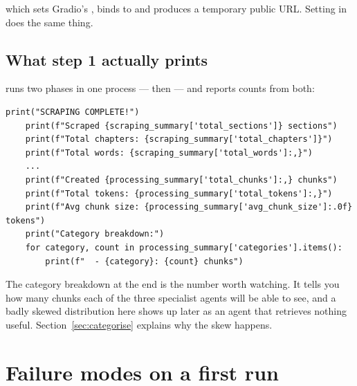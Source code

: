 which sets Gradio's , binds to  and produces a temporary public  URL. Setting  in  does the same thing.

\subsection{What step 1 actually prints}

 runs two phases in one process ---  then  --- and reports counts from both:

\begin{lstlisting}[style=py,firstnumber=36]
    print("SCRAPING COMPLETE!")
    print(f"Scraped {scraping_summary['total_sections']} sections")
    print(f"Total chapters: {scraping_summary['total_chapters']}")
    print(f"Total words: {scraping_summary['total_words']:,}")
    ...
    print(f"Created {processing_summary['total_chunks']:,} chunks")
    print(f"Total tokens: {processing_summary['total_tokens']:,}")
    print(f"Avg chunk size: {processing_summary['avg_chunk_size']:.0f} tokens")
    print("Category breakdown:")
    for category, count in processing_summary['categories'].items():
        print(f"  - {category}: {count} chunks")
\end{lstlisting}

The category breakdown at the end is the number worth watching. It tells you how many chunks each of the three specialist agents will be able to see, and a badly skewed distribution here shows up later as an agent that retrieves nothing useful. Section~\ref{sec:categorise} explains why the skew happens.

\section{Failure modes on a first run}

